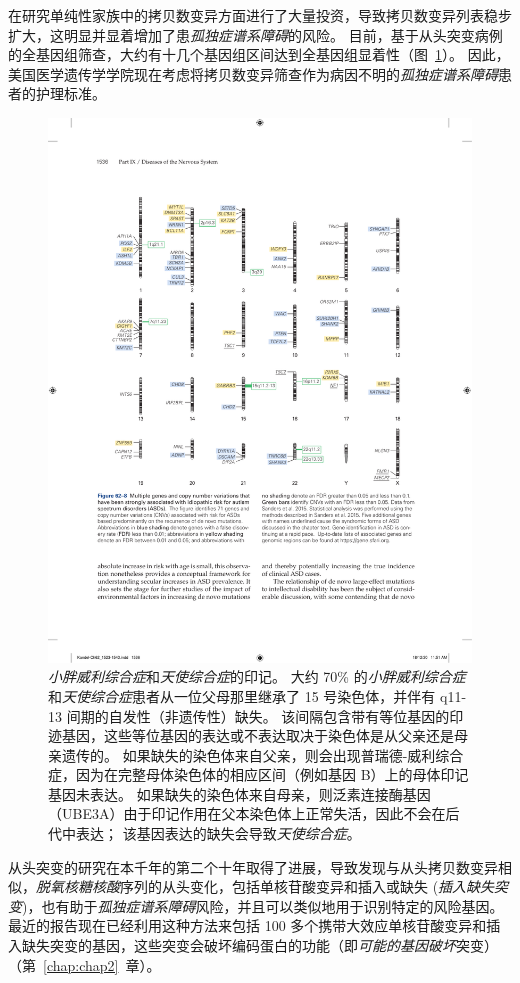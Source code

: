 在研究单纯性家族中的拷贝数变异方面进行了大量投资，导致拷贝数变异列表稳步扩大，这明显并显着增加了患\textit{孤独症谱系障碍}的风险。
目前，基于从头突变病例的全基因组筛查，大约有十几个基因组区间达到全基因组显着性（图~\ref{fig:62_8}）。
因此，美国医学遗传学学院现在考虑将拷贝数变异筛查作为病因不明的\textit{孤独症谱系障碍}患者的护理标准。


\begin{figure}[htbp]
	\centering
	\includegraphics[width=0.9\linewidth]{chap62/fig_62_8}
	\caption{\textit{小胖威利综合症}和\textit{天使综合症}的印记。
		大约 70\% 的\textit{小胖威利综合症}和\textit{天使综合症}患者从一位父母那里继承了 15 号染色体，并伴有 q11-13 间期的自发性（非遗传性）缺失。
		该间隔包含带有等位基因的印迹基因，这些等位基因的表达或不表达取决于染色体是从父亲还是母亲遗传的。
		如果缺失的染色体来自父亲，则会出现普瑞德-威利综合症，因为在完整母体染色体的相应区间（例如基因 B）上的母体印记基因未表达。
		如果缺失的染色体来自母亲，则泛素连接酶基因（UBE3A）由于印记作用在父本染色体上正常失活，因此不会在后代中表达；
		该基因表达的缺失会导致\textit{天使综合症}。}
	\label{fig:62_8}
\end{figure}


从头突变的研究在本千年的第二个十年取得了进展，导致发现与从头拷贝数变异相似，\textit{脱氧核糖核酸}序列的从头变化，包括单核苷酸变异和插入或缺失 (\textit{插入缺失突变})，也有助于\textit{孤独症谱系障碍}风险，并且可以类似地用于识别特定的风险基因。
最近的报告现在已经利用这种方法来包括 100 多个携带大效应单核苷酸变异和插入缺失突变的基因，这些突变会破坏编码蛋白的功能（即\textit{可能的基因破坏}突变）（第~\ref{chap:chap2}~章）。


